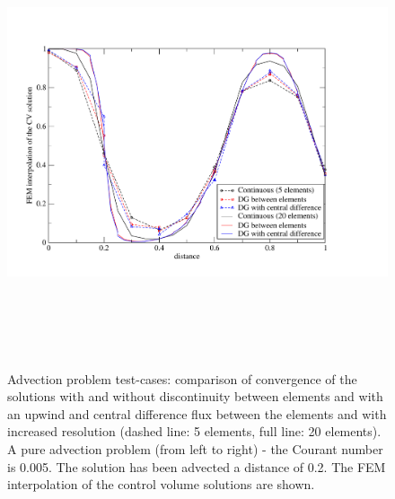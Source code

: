 \begin{figure}[h]
\hbox{\hspace{-1cm}
\includegraphics[width=17.5cm,height=12.5cm]{diagrams/converg-compare-fem}}
\caption{Advection problem test-cases: comparison of convergence of
  the solutions with and without discontinuity between elements and
  with an upwind and central difference flux between the elements and
  with increased resolution (dashed line: 5 elements, full line: 20
  elements). A pure advection problem (from left to right) - the
  Courant number is 0.005. The solution has been advected a distance
  of 0.2. The FEM interpolation of the control volume solutions are
  shown. \label{converg-compare-fem}}
\end{figure}

